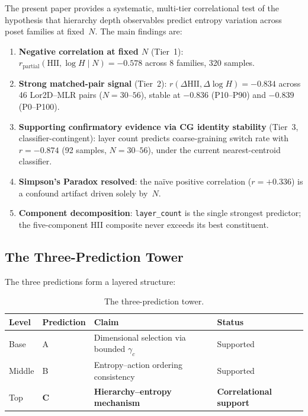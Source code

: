 \documentclass[entropy,article,submit,pdftex,moreauthors]{Definitions/mdpi}
\begin{document}
The present paper provides a systematic, multi-tier correlational test of the hypothesis that hierarchy depth observables predict entropy variation across poset families at fixed~$N$. The main findings are:

\begin{enumerate}[nosep]
    \item \textbf{Negative correlation at fixed $N$} (Tier~1): $r_\text{partial}(\text{HII}, \log H \mid N) = -0.578$ across 8 families, 320 samples.
    \item \textbf{Strong matched-pair signal} (Tier~2): $r(\Delta\text{HII}, \Delta\log H) = -0.834$ across 46 Lor2D--MLR pairs ($N = 30$--$56$), stable at $-0.836$ (P10--P90) and $-0.839$ (P0--P100).
    \item \textbf{Supporting confirmatory evidence via CG identity stability} (Tier~3, classifier-contingent): layer count predicts coarse-graining switch rate with $r = -0.874$ (92 samples, $N = 30$--$56$), under the current nearest-centroid classifier.
    \item \textbf{Simpson's Paradox resolved}: the na\"ive positive correlation ($r = +0.336$) is a confound artifact driven solely by~$N$.
    \item \textbf{Component decomposition}: \texttt{layer\_count} is the single strongest predictor; the five-component HII composite never exceeds its best constituent.
\end{enumerate}

\subsection{The Three-Prediction Tower}

The three predictions form a layered structure:

\begin{table}[H]
\caption{The three-prediction tower.\label{tab:tower}}
\begin{tabular}{llll}
\toprule
\textbf{Level} & \textbf{Prediction} & \textbf{Claim} & \textbf{Status} \\
\midrule
Base & A & Dimensional selection via bounded $\gamma_c$ & Supported~\cite{zhang2026predA} \\
Middle & B & Entropy--action ordering consistency & Supported~\cite{zhang2026predB} \\
Top & \textbf{C} & \textbf{Hierarchy--entropy mechanism} & \textbf{Correlational support} \\
\bottomrule
\end{tabular}
\end{table}
\end{document}
